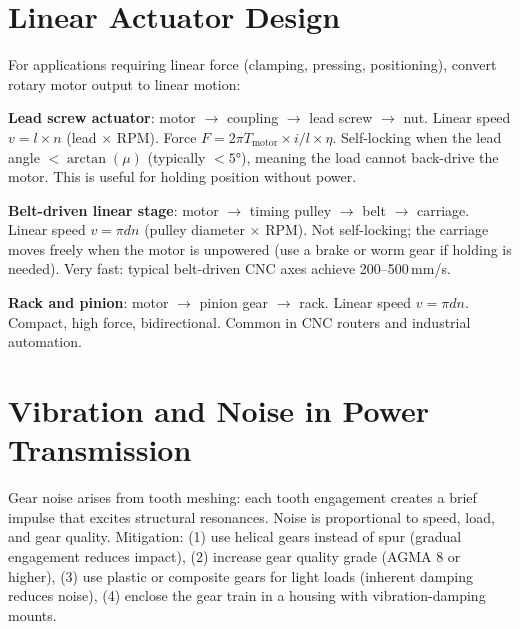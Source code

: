\section{Linear Actuator Design}
For applications requiring linear force (clamping, pressing, positioning), convert rotary motor output to linear motion:

\textbf{Lead screw actuator}: motor $\to$ coupling $\to$ lead screw $\to$ nut. Linear speed $v = l \times n$ (lead $\times$ RPM). Force $F = 2\pi T_{\text{motor}} \times i / l \times \eta$. Self-locking when the lead angle $< \arctan(\mu)$ (typically $< \ang{5}$), meaning the load cannot back-drive the motor. This is useful for holding position without power.

\textbf{Belt-driven linear stage}: motor $\to$ timing pulley $\to$ belt $\to$ carriage. Linear speed $v = \pi d n$ (pulley diameter $\times$ RPM). Not self-locking; the carriage moves freely when the motor is unpowered (use a brake or worm gear if holding is needed). Very fast: typical belt-driven CNC axes achieve 200--500\,mm/s.

\textbf{Rack and pinion}: motor $\to$ pinion gear $\to$ rack. Linear speed $v = \pi d n$. Compact, high force, bidirectional. Common in CNC routers and industrial automation.

\section{Vibration and Noise in Power Transmission}
Gear noise arises from tooth meshing: each tooth engagement creates a brief impulse that excites structural resonances. Noise is proportional to speed, load, and gear quality. Mitigation: (1) use helical gears instead of spur (gradual engagement reduces impact), (2) increase gear quality grade (AGMA 8 or higher), (3) use plastic or composite gears for light loads (inherent damping reduces noise), (4) enclose the gear train in a housing with vibration-damping mounts.

